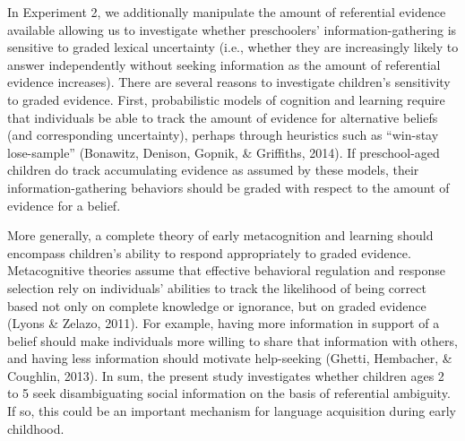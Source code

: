 \documentclass[english,,man]{apa6}
\begin{document}
In Experiment 2, we additionally manipulate the amount of referential
evidence available allowing us to investigate whether preschoolers'
information-gathering is sensitive to graded lexical uncertainty (i.e.,
whether they are increasingly likely to answer independently without
seeking information as the amount of referential evidence increases).
There are several reasons to investigate children's sensitivity to
graded evidence. First, probabilistic models of cognition and learning
require that individuals be able to track the amount of evidence for
alternative beliefs (and corresponding uncertainty), perhaps through
heuristics such as \enquote{win-stay lose-sample} (Bonawitz, Denison,
Gopnik, \& Griffiths, 2014). If preschool-aged children do track
accumulating evidence as assumed by these models, their
information-gathering behaviors should be graded with respect to the
amount of evidence for a belief.

More generally, a complete theory of early metacognition and learning
should encompass children's ability to respond appropriately to graded
evidence. Metacognitive theories assume that effective behavioral
regulation and response selection rely on individuals' abilities to
track the likelihood of being correct based not only on complete
knowledge or ignorance, but on graded evidence (Lyons \& Zelazo, 2011).
For example, having more information in support of a belief should make
individuals more willing to share that information with others, and
having less information should motivate help-seeking (Ghetti, Hembacher,
\& Coughlin, 2013). In sum, the present study investigates whether
children ages 2 to 5 seek disambiguating social information on the basis
of referential ambiguity. If so, this could be an important mechanism
for language acquisition during early childhood.
\end{document}
